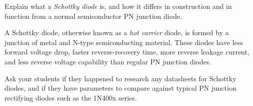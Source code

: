 

Explain what a {\it Schottky diode} is, and how it differs in construction and in function from a normal semiconductor PN junction diode.







A Schottky diode, otherwise known as a {\it hot carrier} diode, is formed by a junction of metal and N-type semiconducting material.  These diodes have less forward voltage drop, faster reverse-recovery time, more reverse leakage current, and less reverse voltage capability than regular PN junction diodes.







Ask your students if they happened to research any datasheets for Schottky diodes, and if they have parameters to compare against typical PN junction rectifying diodes such as the 1N400x series.




